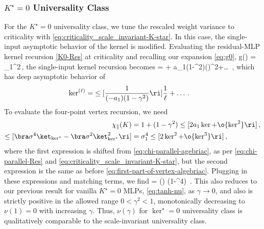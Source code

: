 \subsubsection{$K^\star=0$ Universality Class}
For the $K^{\star}=0$ universality class,  we tune the rescaled weight variance to criticality with \eqref{eq:criticality_scale_invariant-K-star}.  In this case, the single-input asymptotic behavior of the kernel is modified. Evaluating the residual-MLP kernel recursion \eqref{K0-Res} at criticality and recalling our expansion \eqref{eq:g0}, 
\be
g(\ker)
= \sigma_1^2\le[K+a_1 K^2+\o{K^3}\ri] \,,
\ee
the single-input kernel recursion becomes
\be
{}= \Ti{\ker}{}{\ell} + a_1(1-\gamma^2)\le(\Ti{\ker}{}{\ell}\ri)^2+\ldots\,  ,\label{K0-Res-K-star}
\ee
which has deep asymptotic behavior of
\begin{align}
\ker^{(\ell)}=&\le[\frac{1}{(-a_1)(1-\gamma^2)}\ri]\frac{1}{\ell}+\ldots\, .
\end{align}
To evaluate the four-point vertex recursion, we need 
\begin{align}\label{eq:chi-parallel-agebriac-reprint}
\chi_{\parallel}(K)&=1 + (1-\gamma^2) \le[2a_1\ker+\o{\ker^2}\ri]\, ,\\
\label{eq:first-part-of-vertex-algebriac-reprint}
\le[\bra \sigma^4\ket_{\ker^{\star}}-\bra \sigma^2\ket_{\ker^{\star}}^2\ri]&= \sigma_1^4 \le[ 2 \ker^2+\o{\ker^3}\ri]\, , 
\end{align}  
where the first expression is shifted from \eqref{eq:chi-parallel-agebriac}, as per \eqref{eq:chi-parallel-Res} and \eqref{eq:criticality_scale_invariant-K-star}, but the second expression is the same as before \eqref{eq:first-part-of-vertex-algebriac}. Plugging in these expressions and matching terms, we find
\be\label{eq:gamma-nu-k-star}
\nu= \nu(\gamma) \equiv {}(1-\gamma^4)\, .
\ee
This also reduces to our previous result for vanilla $K^\star=0$ MLPs, \eqref{eq:tanh-nu}, 
as $\gamma\to0$, and also is strictly positive in the allowed range $0 < \gamma^2 < 1$, monotonically decreasing to $\nu(1)=0$ with increasing $\gamma$. 
Thus, $\nu(\gamma)$ for $\ker^\star=0$ universality class is qualitatively comparable to
the scale-invariant universality class.




